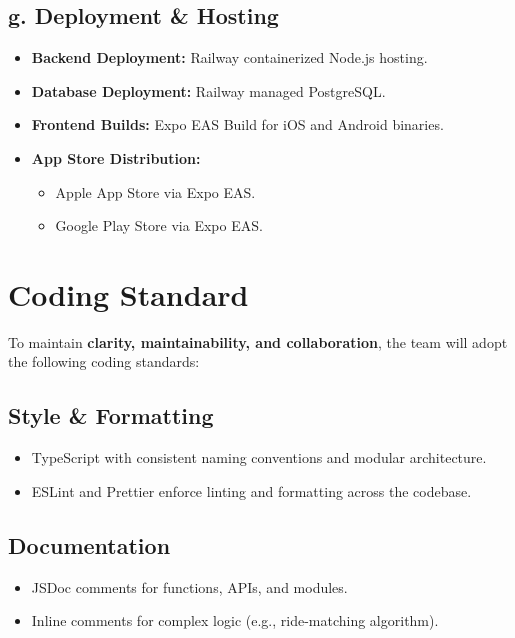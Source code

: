 \documentclass{article}
\begin{document}
\subsection*{g. Deployment \& Hosting}
\begin{itemize}
    \item \textbf{Backend Deployment:} Railway containerized Node.js hosting.
    \item \textbf{Database Deployment:} Railway managed PostgreSQL.
    \item \textbf{Frontend Builds:} Expo EAS Build for iOS and Android binaries.
    \item \textbf{App Store Distribution:}
    \begin{itemize}
        \item Apple App Store via Expo EAS.
        \item Google Play Store via Expo EAS.
    \end{itemize}
\end{itemize}


\section{Coding Standard}


To maintain \textbf{clarity, maintainability, and collaboration}, the team will adopt the following coding standards:

\subsection*{Style \& Formatting}
\begin{itemize}
    \item TypeScript with consistent naming conventions and modular architecture.
    \item ESLint and Prettier enforce linting and formatting across the codebase.
\end{itemize}

\subsection*{Documentation}
\begin{itemize}
    \item JSDoc comments for functions, APIs, and modules.
    \item Inline comments for complex logic (e.g., ride-matching algorithm).
\end{itemize}
\end{document}

